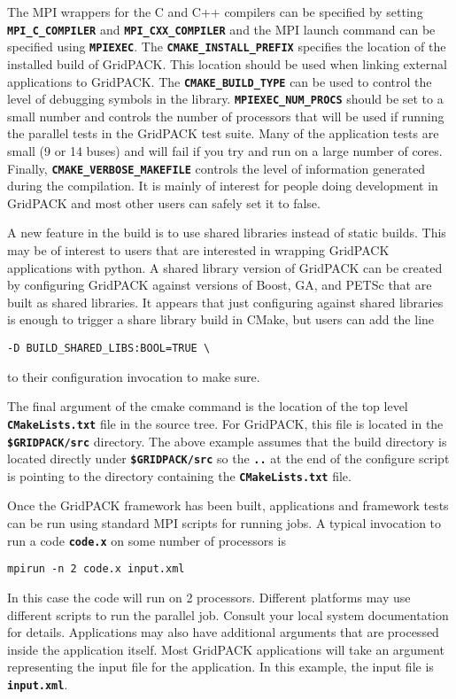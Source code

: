 The MPI wrappers for the C and C++ compilers can be specified by setting \texttt{\textbf{MPI\_C\_COMPILER}} and \texttt{\textbf{MPI\_CXX\_COMPILER}} and the MPI launch command can be specified using \texttt{\textbf{MPIEXEC}}. The \texttt{\textbf{CMAKE\_INSTALL\_PREFIX}} specifies the location of the installed build of GridPACK. This location should be used when linking external applications to GridPACK. The \texttt{\textbf{CMAKE\_BUILD\_TYPE}} can be used to control the level of debugging symbols in the library. \texttt{\textbf{MPIEXEC\_NUM\_PROCS}} should be set to a small number and controls the number of processors that will be used if running the parallel tests in the GridPACK test suite. Many of the application tests are small (9 or 14 buses) and will fail if you try and run on a large number of cores. Finally, \texttt{\textbf{CMAKE\_VERBOSE\_MAKEFILE}} controls the level of information generated during the compilation. It is mainly of interest for people doing development in GridPACK and most other users can safely set it to false.

A new feature in the build is to use shared libraries instead of static builds. This may be of interest to users that are interested in wrapping GridPACK applications with python. A shared library version of GridPACK can be created by configuring GridPACK against versions of Boost, GA, and PETSc that are built as shared libraries. It appears that just configuring against shared libraries is enough to trigger a share library build in CMake, but users can add the line

{
\color{red}
\begin{Verbatim}[fontseries=b]
    -D BUILD_SHARED_LIBS:BOOL=TRUE \
\end{Verbatim}
}

to their configuration invocation to make sure.

The final argument of the cmake command is the location of the top level \texttt{\textbf{CMakeLists.txt}} file in the source tree. For GridPACK, this file is located in the \texttt{\textbf{\$GRIDPACK/src}} directory. The above example assumes that the build directory is located directly under \texttt{\textbf{\$GRIDPACK/src}} so the \texttt{\textbf{..}} at the end of the configure script is pointing to the directory containing the \texttt{\textbf{CMakeLists.txt}} file.

Once the GridPACK framework has been built, applications and framework tests can be run using standard MPI scripts for running jobs. A typical invocation to run a code \texttt{\textbf{code.x}} on some number of processors is

{
\color{red}
\begin{Verbatim}[fontseries=b]
    mpirun -n 2 code.x input.xml
\end{Verbatim}
}

In this case the code will run on 2 processors. Different platforms may use different scripts to run the parallel job. Consult your local system documentation for details. Applications may also have additional arguments that are processed inside the application itself. Most GridPACK applications will take an argument representing the input file for the application. In this example, the input file is \texttt{\textbf{input.xml}}.
